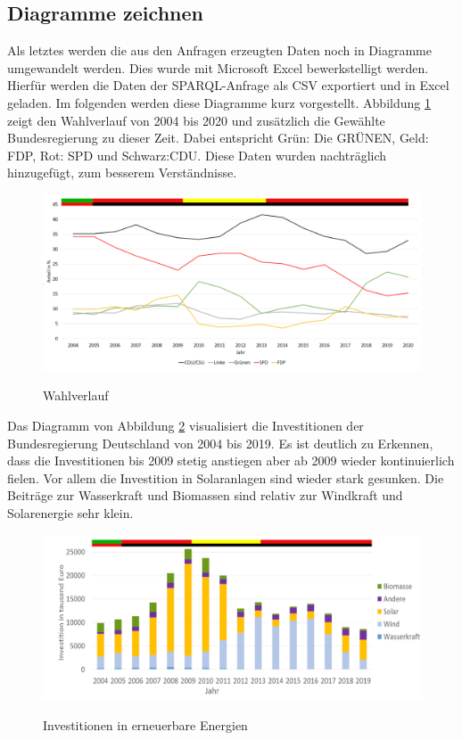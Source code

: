 \documentclass[12pt]{article}
\begin{document}
        \subsection{Diagramme zeichnen}

Als letztes werden die aus den Anfragen erzeugten Daten noch in Diagramme umgewandelt werden. Dies wurde mit Microsoft Excel bewerkstelligt werden. Hierfür werden die Daten der SPARQL-Anfrage als CSV exportiert und in Excel geladen. Im folgenden werden diese Diagramme kurz vorgestellt. Abbildung \ref{fig:dia-wahl} zeigt den Wahlverlauf von 2004 bis 2020 und zusätzlich die Gewählte Bundesregierung zu dieser Zeit. Dabei entspricht Grün: Die GRÜNEN, Geld: FDP, Rot: SPD und Schwarz:CDU. Diese Daten wurden nachträglich hinzugefügt, zum besserem Verständnisse.

\begin{figure}[!ht]
    \caption{Wahlverlauf}
    \centering
    \includegraphics[width=1\textwidth]{images/dia_1.png}
    \label{fig:dia-wahl}
\end{figure}

Das Diagramm von Abbildung \ref{fig:dia-invest} visualisiert die Investitionen der Bundesregierung Deutschland von 2004 bis 2019. Es ist deutlich zu Erkennen, dass die Investitionen bis 2009 stetig anstiegen aber ab 2009 wieder kontinuierlich fielen. Vor allem die Investition in Solaranlagen sind wieder stark gesunken. Die Beiträge zur Wasserkraft und Biomassen sind relativ zur Windkraft und Solarenergie sehr klein.

\begin{figure}[!ht]
    \caption{Investitionen in erneuerbare Energien}
    \centering
    \includegraphics[width=1.2\textwidth]{images/dia_2.png}
    \label{fig:dia-invest}
\end{figure}
\end{document}

